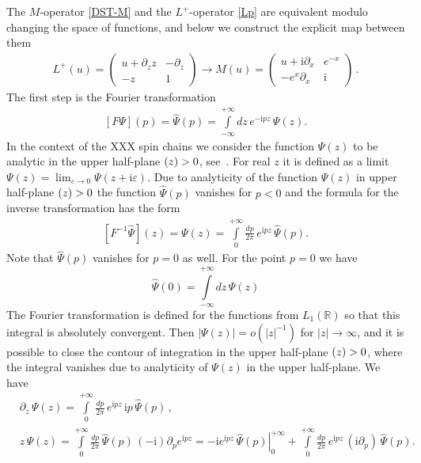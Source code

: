 \documentclass[11pt]{article}
\numberwithin{equation}{section}
\theoremstyle{plain}
\theoremstyle{definition}
\def\dd{\partial}
\let\Im\relax
\DeclareMathOperator{\Im}{Im}
\renewcommand{\imath}{\mathrm{i}}
\begin{document}
The $M$-operator \eqref{DST-M} and the 
$L^{+}$-operator \eqref{Lp} are equivalent modulo changing the space of functions, and below we construct 
the explicit map between them  
\begin{align*}
	L^+(u) = \left(\begin{array}{cc}
		u + \dd_z z & -\dd_z \\
		-z& 1\end{array}\right)  \longrightarrow  M(u) = 
	\begin{pmatrix}
		u + \imath \partial_{x} & e^{-x} \\[4pt]
		-e^{x} \partial_{x} & \imath
	\end{pmatrix}\,.
\end{align*}
The first step is the Fourier transformation 
\begin{align}\label{Fourier} 
	\left[ F\Psi\right](p) = \hat{\Psi}(p) =  
	\int\limits_{-\infty}^{+\infty} d z\, e^{-\imath pz}\, \Psi(z).
\end{align}
In the context of the XXX spin chains we consider the function $\Psi(z)$ to be analytic in the upper half-plane $\Im(z)>0$, see~\cite{ABDK}.
For real $z$ it is defined as a limit 
$\Psi(z) = \lim_{\varepsilon\to 0} \Psi(z+\imath\varepsilon)$. 
Due to analyticity of the function $\Psi(z)$ in upper half-plane $\Im(z)>0$ 
the function $\hat{\Psi}(p)$ vanishes for $p < 0$ and 
the formula for the inverse transformation has the form   
\begin{align} 
	\left[F^{-1}\hat{\Psi}\right](z) = \Psi(z) =  
	\int\limits_{0}^{+\infty} \frac{d p}{2\pi}\, e^{\imath p z}\, \hat{\Psi}(p).
\end{align}
Note that $\hat{\Psi}(p)$ vanishes for $p = 0$ as well.
For the point $p=0$ we have  
$$
\hat{\Psi}(0) = \int\limits_{-\infty}^{+\infty} d z\,\Psi(z) 
$$
The Fourier transformation is defined for the functions from 
$L_1(\mathbb{R})$ so that this integral is absolutely convergent.
Then $|\Psi(z)| = o(|z|^{-1})$ for $|z|\to \infty$, and it is possible to
close the contour of integration in the upper half-plane $\Im(z)>0$, where the integral vanishes due to analyticity of $\Psi(z)$ in the upper half-plane.
We have
\begin{align*}
	&\partial_z\,\Psi(z) =  
	\int\limits_{0}^{+\infty} \frac{d p}{2\pi}\, e^{\imath p z}\,\imath p\,\hat{\Psi}(p)\,, \\ 
	&z\,\Psi(z) =  
	\int\limits_{0}^{+\infty} \frac{d p}{2\pi}\,\hat{\Psi}(p)\,
	(-\imath)\partial_p e^{\imath p z} = -\imath
	\left. e^{\imath p z}\,\hat{\Psi}(p)
	\right|_{0}^{+\infty}
	+\int\limits_{0}^{+\infty} \frac{d p}{2\pi}\,e^{\imath p z}\,
	(\imath \partial_p)\,\hat{\Psi}(p).
\end{align*}
\end{document}
